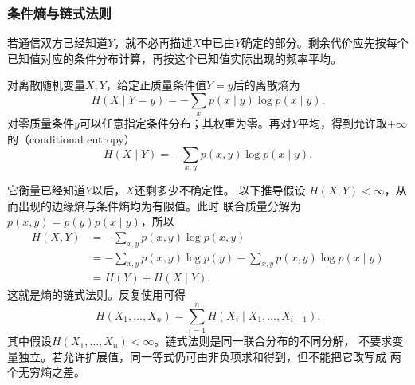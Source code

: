 \subsubsection{条件熵与链式法则}
若通信双方已经知道\(Y\)，就不必再描述\(X\)中已由\(Y\)确定的部分。剩余代价应先按每个已知值对应的条件分布计算，再按这个已知值实际出现的频率平均。
\begin{definition}[离散条件熵]
  \label{def:information-conditional-entropy}
对离散随机变量\(X,Y\)，给定正质量条件值\(Y=y\)后的离散熵为
\[
  H(X\mid Y=y)
  =
  -\sum_xp(x\mid y)\log p(x\mid y).
\]
对零质量条件\(y\)可以任意指定条件分布；其权重为零。再对\(Y\)平均，得到允许取\(+\infty\)的（conditional entropy）
\begin{equation}
  H(X\mid Y)
  =
  -\sum_{x,y}p(x,y)\log p(x\mid y).
  \label{eq:information-conditional-entropy}
\end{equation}
\end{definition}
它衡量已经知道\(Y\)以后，\(X\)还剩多少不确定性。
以下推导假设
\(H(X,Y)<\infty\)，从而出现的边缘熵与条件熵均为有限值。此时
联合质量分解为\(p(x,y)=p(y)p(x\mid y)\)，所以
\[
\begin{aligned}
  H(X,Y)
  &=
  -\sum_{x,y}p(x,y)\log p(x,y)\\
  &=
  -\sum_{x,y}p(x,y)\log p(y)
  -\sum_{x,y}p(x,y)\log p(x\mid y)\\
  &=
  H(Y)+H(X\mid Y).
\end{aligned}
\]
这就是熵的链式法则。反复使用可得
\begin{equation}
  H(X_1,\ldots,X_n)
  =
  \sum_{i=1}^{n}H(X_i\mid X_1,\ldots,X_{i-1}).
  \label{eq:information-entropy-chain-rule}
\end{equation}
其中假设\(H(X_1,\ldots,X_n)<\infty\)。链式法则是同一联合分布的不同分解，
不要求变量独立。若允许扩展值，同一等式仍可由非负项求和得到，但不能把它改写成
两个无穷熵之差。
